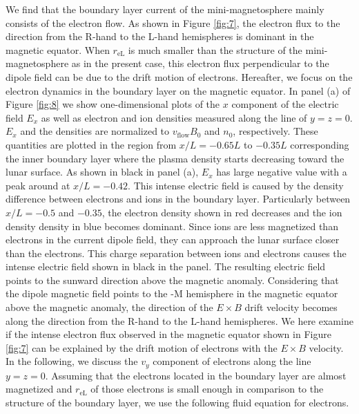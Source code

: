 \documentclass[draft,jgrga]{agutex2015}
\begin{document}
\begin{article}
We find that the boundary layer current of the mini-magnetosphere 
mainly consists of the electron flow. 
As shown in Figure \ref{fig:7}, 
the electron flux to the direction from the R-hand to the L-hand hemispheres 
is dominant in the magnetic equator.
When $r_\mathrm{eL}$ is much smaller than the structure of the
mini-magnetosphere as in the present case,
this electron flux perpendicular to the dipole field can be due to the drift motion of electrons.
Hereafter, we focus on the electron dynamics in the boundary layer on the magnetic equator.
In panel (a) of Figure \ref{fig:8} 
we show one-dimensional plots of the $x$ component of 
the electric field $E_x$ as well as
electron and ion densities measured along the line of $y=z=0$. 
$E_x$ and the densities are normalized to 
$v_\mathrm{flow} B_\mathrm{0}$ and $n_\mathrm{0}$, respectively.
These quantities are plotted in the region from $x/L = -0.65L$ to $-0.35L$
corresponding the inner boundary layer
where the plasma density starts decreasing toward the lunar surface.
As shown in black in panel (a), 
$E_x$ has large negative value with 
a peak around at  $x/L = -0.42 $.
This intense electric field is caused by the density difference 
between electrons and ions in the boundary layer.
Particularly between $x/L = -0.5$  and $-0.35$, 
the electron density shown in red decreases and 
the ion density density in blue becomes dominant.
Since ions are less magnetized than electrons in the current dipole field, 
they can approach the lunar surface closer than the electrons.
This charge separation between ions and electrons
causes the intense electric field shown in black in the panel.
The resulting electric field points to the sunward direction
above the magnetic anomaly.
Considering that the dipole magnetic field points
to the -M hemisphere in the magnetic equator
above the magnetic anomaly,
the direction of the $E \times B$ drift velocity becomes 
along the direction from the R-hand to the L-hand hemispheres. 
We here examine if the intense electron flux observed in the magnetic equator
shown in Figure \ref{fig:7} can be explained by the drift motion of electrons
with the $E \times B$ velocity. 
In the following, 
we discuss the $v_y$ component of electrons along the line $y=z=0$.
Assuming that the electrons located in the boundary layer 
are almost magnetized and 
$r_\mathrm{eL}$ of those electrons is small enough in comparison 
to the structure of the boundary layer, 
we use the following fluid equation for electrons.
 

\end{article}
\end{document}
